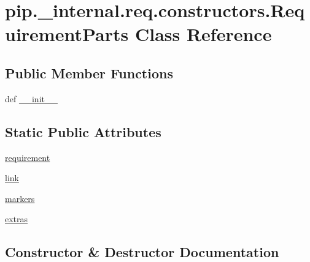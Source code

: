 \hypertarget{classpip_1_1__internal_1_1req_1_1constructors_1_1RequirementParts}{}\section{pip.\+\_\+internal.\+req.\+constructors.\+Requirement\+Parts Class Reference}
\label{classpip_1_1__internal_1_1req_1_1constructors_1_1RequirementParts}
\subsection*{Public Member Functions}
\begin{DoxyCompactItemize}
\item 
def \hyperlink{classpip_1_1__internal_1_1req_1_1constructors_1_1RequirementParts_a913ff7de659e8ed33ea92aa54863ead1}{\+\_\+\+\_\+init\+\_\+\+\_\+}
\end{DoxyCompactItemize}
\subsection*{Static Public Attributes}
\begin{DoxyCompactItemize}
\item 
\hyperlink{classpip_1_1__internal_1_1req_1_1constructors_1_1RequirementParts_a4ab41eb5e9892b3a2aff6ab94201eeca}{requirement}
\item 
\hyperlink{classpip_1_1__internal_1_1req_1_1constructors_1_1RequirementParts_a28ae9970849f9f0e9c2b5346f12a90c8}{link}
\item 
\hyperlink{classpip_1_1__internal_1_1req_1_1constructors_1_1RequirementParts_ab6e19a4f59f415e927bb8c74b1197d72}{markers}
\item 
\hyperlink{classpip_1_1__internal_1_1req_1_1constructors_1_1RequirementParts_a09701ab04d7653c7af7d6029d810ee91}{extras}
\end{DoxyCompactItemize}


\subsection{Constructor \& Destructor Documentation}
\mbox{\label{classpip_1_1__internal_1_1req_1_1constructors_1_1RequirementParts_a913ff7de659e8ed33ea92aa54863ead1}} 
